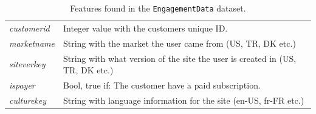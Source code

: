 \begin{table}[H]
\begin{tabularx}{\textwidth}{l|X}
		\textit{customerid}                      & Integer value with the customers unique ID.                                                                \\
		\textit{marketname}                      & String with the market the user came from (US, TR, DK etc.)                                                \\
		\textit{siteverkey}                      & String with what version of the site the user is created in (US, TR, DK etc.)                              \\
		\textit{ispayer}                         & Bool, true if: The customer have a paid subscription.                                                      \\
		\textit{culturekey}                      & String with language information for the site (en-US, fr-FR etc.)
	\end{tabularx}
	\caption{Features found in the \texttt{EngagementData} dataset.}
	\label{tab:engdatalayout}
\end{table}


